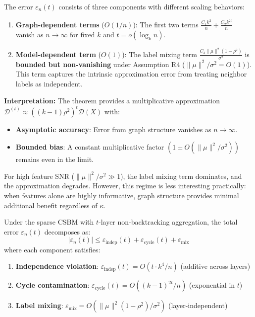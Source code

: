 \begin{remark}
\label{rem:validity_regime_error}
The error $\varepsilon_n(t)$ consists of three components with different scaling behaviors:
\begin{enumerate}
    \item \textbf{Graph-dependent terms} ($O(1/n)$): The first two terms $\frac{C_1 k^2}{n} + \frac{C_2 k^{2t}}{n}$ vanish as $n \to \infty$ for fixed $k$ and $t = o(\log_k n)$.

    \item \textbf{Model-dependent term} ($O(1)$): The label mixing term $\frac{C_3 \|\mu\|^2 (1-\rho^2)}{\sigma^2}$ is \textbf{bounded but non-vanishing} under Assumption R4 ($\|\mu\|^2/\sigma^2 = O(1)$). This term captures the intrinsic approximation error from treating neighbor labels as independent.
\end{enumerate}

\textbf{Interpretation:} The theorem provides a multiplicative approximation $\mathcal{D}^{(t)} \approx ((k-1)\rho^2)^t \mathcal{D}(X)$ with:
\begin{itemize}
    \item \textbf{Asymptotic accuracy}: Error from graph structure vanishes as $n \to \infty$.
    \item \textbf{Bounded bias}: A constant multiplicative factor $(1 \pm O(\|\mu\|^2/\sigma^2))$ remains even in the limit.
\end{itemize}

For high feature SNR ($\|\mu\|^2/\sigma^2 \gg 1$), the label mixing term dominates, and the approximation degrades. However, this regime is less interesting practically: when features alone are highly informative, graph structure provides minimal additional benefit regardless of $\kappa$.
\end{remark}

\begin{lemma}
\label{lem:error_composition}
Under the sparse CSBM with $t$-layer non-backtracking aggregation, the total error $\varepsilon_n(t)$ decomposes as:
\begin{equation}
    |\varepsilon_n(t)| \leq \varepsilon_{\mathrm{indep}}(t) + \varepsilon_{\mathrm{cycle}}(t) + \varepsilon_{\mathrm{mix}}
\end{equation}
where each component satisfies:
\begin{enumerate}
    \item \textbf{Independence violation}: $\varepsilon_{\mathrm{indep}}(t) = O(t \cdot k^4/n)$ (additive across layers)
    \item \textbf{Cycle contamination}: $\varepsilon_{\mathrm{cycle}}(t) = O((k-1)^{2t}/n)$ (exponential in $t$)
    \item \textbf{Label mixing}: $\varepsilon_{\mathrm{mix}} = O(\|\mu\|^2(1-\rho^2)/\sigma^2)$ (layer-independent)
\end{enumerate}
\end{lemma}

